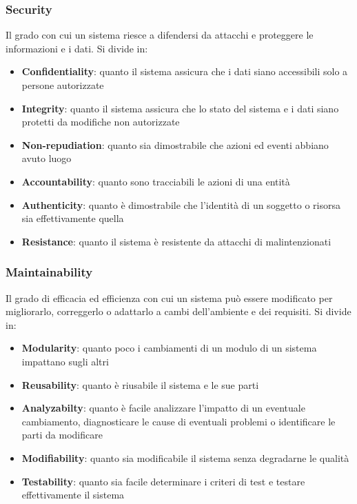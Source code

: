 \subsubsection{Security}
Il grado con cui un sistema riesce a difendersi da attacchi e proteggere le informazioni e i dati. Si divide in:
\begin{itemize}
	\item \textbf{Confidentiality}: quanto il sistema assicura che i dati siano accessibili solo a persone autorizzate
	\item \textbf{Integrity}: quanto il sistema assicura che lo stato del sistema e i dati siano protetti da modifiche non autorizzate
	\item \textbf{Non-repudiation}: quanto sia dimostrabile che azioni ed eventi abbiano avuto luogo
	\item \textbf{Accountability}: quanto sono tracciabili le azioni di una entità
	\item \textbf{Authenticity}: quanto è dimostrabile che l'identità di un soggetto o risorsa sia effettivamente quella
	\item \textbf{Resistance}: quanto il sistema è resistente da attacchi di malintenzionati
\end{itemize}

\subsubsection{Maintainability}
Il grado di efficacia ed efficienza con cui un sistema può essere modificato per migliorarlo, correggerlo o adattarlo a cambi dell'ambiente e dei requisiti. Si divide in:
\begin{itemize}
	\item \textbf{Modularity}: quanto poco i cambiamenti di un modulo di un sistema impattano sugli altri
	\item \textbf{Reusability}: quanto è riusabile il sistema e le sue parti
	\item \textbf{Analyzabilty}: quanto è facile analizzare l'impatto di un eventuale cambiamento, diagnosticare le cause di eventuali problemi o identificare le parti da modificare
	\item \textbf{Modifiability}: quanto sia modificabile il sistema senza degradarne le qualità
	\item \textbf{Testability}: quanto sia facile determinare i criteri di test e testare effettivamente il sistema
\end{itemize}

